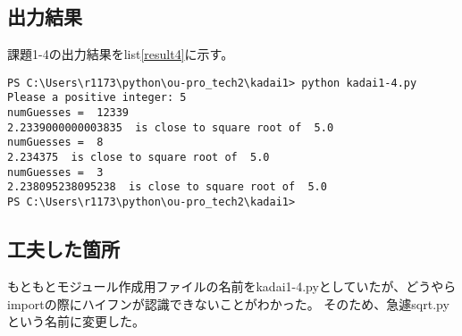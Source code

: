 \documentclass[a4paper]{ltjsarticle}
\begin{document}
\subsection*{出力結果}
課題1-4の出力結果をlist\ref{result4}に示す。
\begin{lstlisting}[caption=output, label=result4]
PS C:\Users\r1173\python\ou-pro_tech2\kadai1> python kadai1-4.py
Please a positive integer: 5
numGuesses =  12339
2.2339000000003835  is close to square root of  5.0
numGuesses =  8
2.234375  is close to square root of  5.0
numGuesses =  3
2.238095238095238  is close to square root of  5.0
PS C:\Users\r1173\python\ou-pro_tech2\kadai1>
\end{lstlisting}

\subsection*{工夫した箇所}
もともとモジュール作成用ファイルの名前をkadai1-4.pyとしていたが、どうやらimportの際にハイフンが認識できないことがわかった。
そのため、急遽sqrt.pyという名前に変更した。
\end{document}

